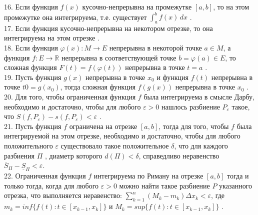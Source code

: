 \documentclass[12pt]{article}
\begin{document}
16. Если функция ${\displaystyle f(x)}$ кусочно-непрерывна на промежутке ${\displaystyle [a,b]}$, то на этом промежутке она интегрируема, т.е. существует ${\displaystyle \int _{a}^{b} f(x) \, dx}$ .\\

17. Если функция кусочно-непрерывна на некотором отрезке, то она интегрируема на этом отрезке .\\

18. Если функция ${\displaystyle \varphi(x)\colon M \to E}$ непрерывна в некоторой точке ${\displaystyle a \in M}$, а функция ${\displaystyle f \colon E \to \mathbb{R}}$ непрерывна в соответствующей точке ${\displaystyle b=\varphi(a) \in E}$, то сложная функция ${\displaystyle F(t)=f(\varphi(t))}$ непрерывна в точке ${\displaystyle t=a}$ .\\

19. Пусть функция ${\displaystyle g(x)}$  непрерывна в точке ${\displaystyle x_0}$ и функция ${\displaystyle f(t)}$  непрерывна в точке ${\displaystyle t0 = g(x_0)}$, тогда сложная функция  ${\displaystyle f(g(x))}$ непрерывна в точке ${\displaystyle x_0}$ .\\

20. Для того, чтобы ограниченная функция ${\displaystyle f}$ была интегрируема в смысле Дарбу, необходимо и достаточно, чтобы для любого ${\displaystyle \varepsilon>0}$ нашлось разбиение ${\displaystyle P_{\varepsilon}}$ такое, что ${\displaystyle S(f, P_{\varepsilon})-s(f, P_{\varepsilon})<\varepsilon}$ .\\

21. Пусть функция ${\displaystyle f}$ ограничена на отрезке ${\displaystyle \left[ {a,b} \right]}$, тогда для того, чтобы ${\displaystyle f}$ была интегрируемой на этом отрезке, необходимо и достаточно, чтобы  для любого положительного ${\displaystyle \varepsilon}$ существовало такое положительное ${\displaystyle \delta}$, что для каждого разбиения ${\displaystyle \Pi}$ , диаметр которого ${\displaystyle d\left( \Pi \right) < \delta}$, справедливо неравенство ${\displaystyle {\overline S_{\Pi} } - {\underline S_{\Pi}} < \varepsilon}$.\\

22. Ограниченная функция ${\displaystyle f}$ интегрируема по Риману на отрезке ${\displaystyle [a,b]}$ тогда и только тогда, когда для любого ${\displaystyle \varepsilon>0}$ можно найти такое разбиение ${\displaystyle P}$ указанного отрезка, что выполняется неравенство: ${\displaystyle \sum \limits _{k=1}^{n} (M_k-m_k)\Delta x_k<\varepsilon}$, где ${\displaystyle m_k=inf \{f(t):t\in[x_{k-1},x_k]\}}$ и ${\displaystyle M_k=sup \{f(t):t\in[x_{k-1},x_k]\}}$ .\\
\end{document}
